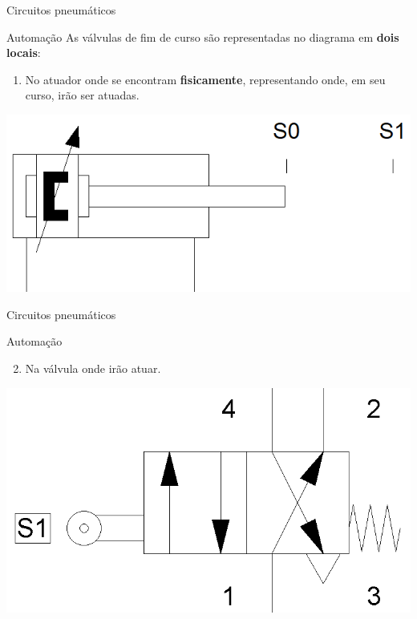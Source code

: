 \begin{frame}{Circuitos pneumáticos}
	\begin{block}{Automação}
		As válvulas de fim de curso são representadas no diagrama em \textbf{dois locais}:
		\begin{enumerate}
			\item No atuador onde se encontram \textbf{fisicamente}, representando onde, em seu curso, irão ser atuadas.
		\end{enumerate}
	\end{block}
	
	\medskip
	
	\centering
	\includegraphics[width=0.8\linewidth]{Figuras/Ch14/fig45}
	
\end{frame}


\begin{frame}{Circuitos pneumáticos}
	\begin{block}{Automação}
		\begin{enumerate}
			\setcounter{enumi}{1}
			\item Na válvula onde irão atuar.
		\end{enumerate}
	\end{block}
	
	\medskip
	
	\centering
	\includegraphics[width=0.8\linewidth]{Figuras/Ch14/fig46}
	
\end{frame}


